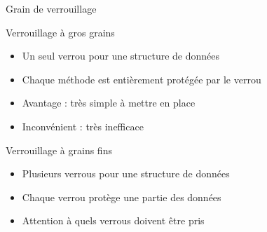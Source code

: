 
\begingroup

\begin{frame}{Grain de verrouillage}

  \vfill
  \begin{block}{Verrouillage à gros grains}
    \begin{itemize}
    \item Un seul verrou pour une structure de données
    \item Chaque méthode est entièrement protégée par le verrou
    \item Avantage : très simple à mettre en place
    \item Inconvénient : très inefficace
    \end{itemize}
  \end{block}

  \vfill
  \begin{block}{Verrouillage à grains fins}
    \begin{itemize}
    \item Plusieurs verrous pour une structure de données
    \item Chaque verrou protège une partie des données
    \item Attention à quels verrous doivent être pris
    \end{itemize}
  \end{block}
  \vfill

\end{frame}

\endgroup
\endinput
